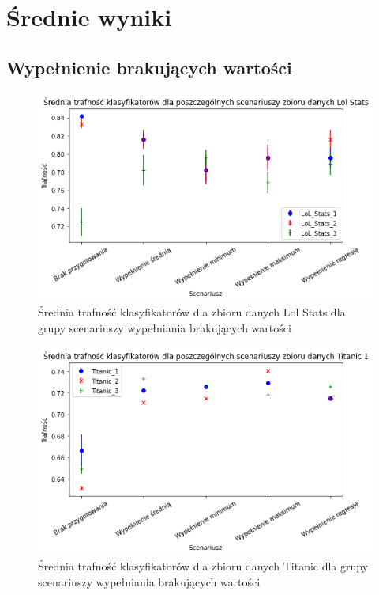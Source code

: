 \documentclass{book}
\begin{document}
\section{Średnie wyniki}

\subsection{Wypełnienie brakujących wartości}

\begin{figure}[H]
    \centerline{\includegraphics[scale=0.8]{Lol_Stats_Avg_Wypełnienie_brakujących}}
    \centering
    \caption{Średnia trafność klasyfikatorów dla zbioru danych Lol Stats 
    dla grupy scenariuszy wypełniania brakujących wartości}
    \end{figure}

\begin{figure}[H]
    \centerline{\includegraphics[scale=0.8]{Titanic_Avg_Wypełnienie_brakujących}}
    \centering
    \caption{Średnia trafność klasyfikatorów dla zbioru danych Titanic 
    dla grupy scenariuszy wypełniania brakujących wartości}
    \end{figure}
\end{document}
